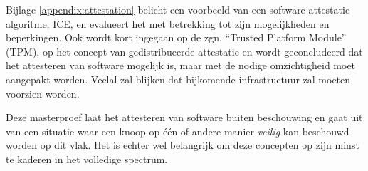 Bijlage \ref{appendix:attestation} belicht een voorbeeld van een software
attestatie algoritme, ICE, en evalueert het met betrekking tot zijn
mogelijkheden en beperkingen. Ook wordt kort ingegaan op de zgn. ``Trusted
Platform Module'' (TPM), op het concept van gedistribueerde attestatie en wordt
geconcludeerd dat het attesteren van software mogelijk is, maar met de nodige
omzichtigheid moet aangepakt worden. Veelal zal blijken dat bijkomende
infrastructuur zal moeten voorzien worden.

Deze masterproef laat het attesteren van software buiten beschouwing en gaat
uit van een situatie waar een knoop op \'e\'en of andere manier \emph{veilig}
kan beschouwd worden op dit vlak. Het is echter wel belangrijk om deze
concepten op zijn minst te kaderen in het volledige spectrum.
